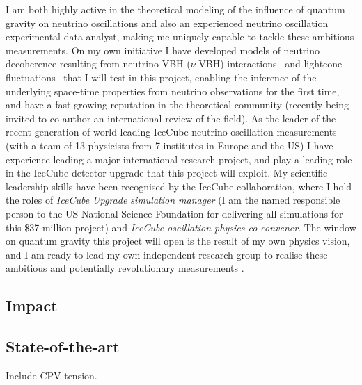 \documentclass[a4paper,11pt]{article}
\begin{document}
I am both highly active in the theoretical modeling of the influence of quantum gravity on neutrino oscillations and also an experienced neutrino oscillation experimental data analyst, making me uniquely capable to tackle these ambitious measurements. On my own initiative I have developed models of neutrino decoherence resulting from neutrino-VBH ($\nu$-VBH) interactions~\cite{PhysRevD.102.115003} and lightcone fluctuations~\cite{2103.15313} that I will test in this project, enabling the inference of the underlying space-time properties from neutrino observations for the first time, and have a fast growing reputation in the theoretical community (recently being invited to co-author an international review of the field). As the leader of the recent generation of world-leading IceCube neutrino oscillation measurements (with a team of 13 physicists from 7 institutes in Europe and the US) I have experience leading a major international research project, and play a leading role in the IceCube detector upgrade that this project will exploit. My scientific leadership skills have been recognised by the IceCube collaboration, where I hold the roles of \textit{IceCube Upgrade simulation manager} (I am the named responsible person to the US National Science Foundation for delivering all simulations for this \$37 million project) and \textit{IceCube oscillation physics co-convener}. The window on quantum gravity this project will open is the result of my own physics vision, and I am ready to lead my own independent research group to realise these ambitious and potentially revolutionary measurements . \\



\subsection{Impact}

\subsection{State-of-the-art}

Include CPV tension.
\end{document}
